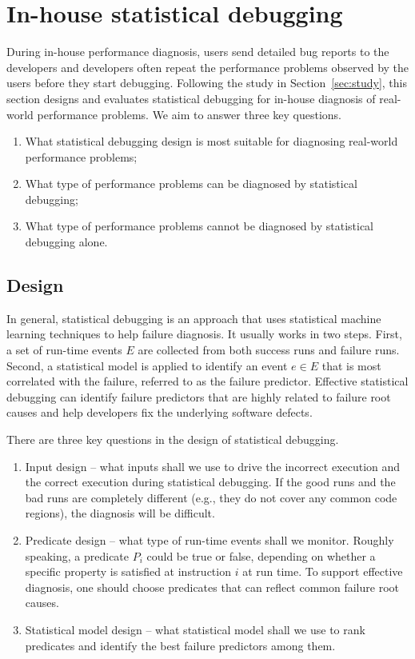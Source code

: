 \section{In-house statistical debugging}
\label{sec:inhouse}
During in-house performance diagnosis, users send detailed bug reports to
the developers and developers often repeat the performance problems
observed by the users before they start debugging.
Following the study in Section~\ref{sec:study}, this section designs and
evaluates statistical debugging for in-house diagnosis of real-world
performance problems.
We aim to answer three key questions.

\begin{enumerate}
\item What statistical debugging design is most suitable for diagnosing
real-world performance problems;
\item What type of performance problems can be diagnosed by statistical
debugging;
\item What type of performance problems cannot be diagnosed by statistical
debugging alone.
\end{enumerate}

\subsection{Design}
In general, statistical debugging 
\citep{liblit03,liblit05,CCI,tarantula1,tarantula2,tarantula.darko,joy.asplos13}
is an approach that uses statistical machine learning techniques to help
failure diagnosis. It usually works in two steps.
First, a set of run-time 
events $E$ are collected from both success runs and failure runs.
Second, a statistical model is applied to identify an event $e \in E $
that is most correlated with the failure, referred to as the failure predictor. 
Effective statistical debugging can identify failure predictors that are
highly related to failure root causes and help developers fix the underlying
software defects.

There are three key questions in the design of statistical debugging.
\begin{enumerate}
\item Input design --
what inputs shall we use to drive the 
incorrect execution and the correct execution during statistical debugging.
If the good runs and the bad runs are completely different
(e.g., they do not cover any common code regions), the diagnosis will
be difficult.
\item Predicate design -- what type of run-time events shall we monitor.
Roughly speaking, a predicate $P_i$ could be true or false, depending on 
whether a specific property is satisfied at instruction $i$ at run time.
To support effective diagnosis, one should choose predicates that can reflect 
common failure root causes.
\item Statistical model design -- what statistical model shall we use to
rank predicates and identify the best failure predictors among them.
\end{enumerate}


